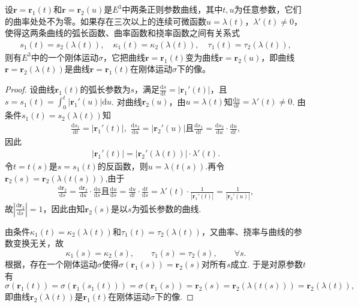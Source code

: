\documentclass[../../main.tex]{subfiles}%
\begin{document}
\begin{corollary}
设$\bm{r} = \bm{r}_1(t)$和$\bm{r} = \bm{r}_2(u)$是$E^3$中两条正则参数曲线，其中$t,u$为任意参数，它们的曲率处处不为零。如果存在三次以上的连续可微函数$u = \lambda(t)$，$\lambda'(t) \neq 0$，使得这两条曲线的弧长函数、曲率函数和挠率函数之间有关系式
\begin{align}
s_1(t) = s_2(\lambda(t)),\quad \kappa_1(t) = \kappa_2(\lambda(t)),\quad \tau_1(t) = \tau_2(\lambda(t)),
\label{eq:--3ur0jfdjgijiL:LIHFIOAWHFNASawf5.4}
\end{align}
则有$E^3$中的一个刚体运动$\sigma$，它把曲线$\bm{r} = \bm{r}_1(t)$变为曲线$\bm{r} = \bm{r}_2(u)$，即曲线$\bm{r} = \bm{r}_2(\lambda(t))$是曲线$\bm{r} = \bm{r}_1(t)$在刚体运动$\sigma$下的像。
\end{corollary}
\begin{proof}
设曲线$\bm{r}_1(t)$的弧长参数为$s$，满足$\frac{\mathrm{d}s}{\mathrm{d}t}=|\bm{r}_1'(t)|$，且$s=s_1(t)=\int_0^t|\bm{r}_1'(u)|\mathrm{d}u$. 对曲线$\bm{r}_2(u)$，由$u=\lambda(t)$知$\frac{\mathrm{d}u}{\mathrm{d}t}=\lambda'(t)\neq0$. 由条件$s_1(t)=s_2(\lambda(t))$知
\begin{align*}
\frac{\mathrm{d}s_1}{\mathrm{d}t}=|\bm{r}_1'(t)|,\,\,\frac{\mathrm{d}s_2}{\mathrm{d}u}=|\bm{r}_2'(u)|\text{且}\frac{\mathrm{d}s_1}{\mathrm{d}t}=\frac{\mathrm{d}s_2}{\mathrm{d}u}\cdot\frac{\mathrm{d}u}{\mathrm{d}t},
\end{align*}
因此
\begin{align*}
|\bm{r}_1'(t)|=|\bm{r}_2'(\lambda(t))|\cdot\lambda'(t).
\end{align*}
令$t=t(s)$是$s=s_1(t)$的反函数，则$u=\lambda(t(s))$.再令$\bm{r}_2(s)=\bm{r}_2(\lambda(t(s)))$,由于
\begin{align*}
\frac{\mathrm{d}\bm{r}_2}{\mathrm{d}s}=\frac{\mathrm{d}\bm{r}_2}{\mathrm{d}u}\cdot\frac{\mathrm{d}u}{\mathrm{d}s}\text{且}\frac{\mathrm{d}u}{\mathrm{d}s}=\frac{\mathrm{d}u}{\mathrm{d}t}\cdot\frac{\mathrm{d}t}{\mathrm{d}s}=\lambda'(t)\cdot\frac{1}{|\bm{r}_1'(t)|}= \frac{1}{|\bm{r}_2'(u)|},
\end{align*}
故$\left|\frac{\mathrm{d}\bm{r}_2}{\mathrm{d}s}\right|=1$，因此由知$\bm{r}_2(s)$是以$s$为弧长参数的曲线.

由条件$\kappa_1(t)=\kappa_2(\lambda(t))$和$\tau_1(t)=\tau_2(\lambda(t))$，又曲率、挠率与曲线的参数变换无关，故
\[
\kappa_1(s)=\kappa_2(s),\qquad \tau_1(s)=\tau_2(s),\qquad \forall s.
\]
根据，存在一个刚体运动$\sigma$使得$\sigma(\bm{r}_1(s))=\bm{r}_2(s)$对所有$s$成立. 于是对原参数$t$有
\[
\sigma \left( \boldsymbol{r}_1\left( t \right) \right) =\sigma \left( \boldsymbol{r}_1\left( s_1\left( t \right) \right) \right) =\sigma \left( \boldsymbol{r}_1\left( s \right) \right) =\boldsymbol{r}_2\left( s \right) =\boldsymbol{r}_2\left( \lambda \left( t\left( s \right) \right) \right) =\boldsymbol{r}_2\left( \lambda \left( t \right) \right) ,
\]
即曲线$\bm{r}_2(\lambda(t))$是$\bm{r}_1(t)$在刚体运动$\sigma$下的像.
\end{proof}
\end{document}
